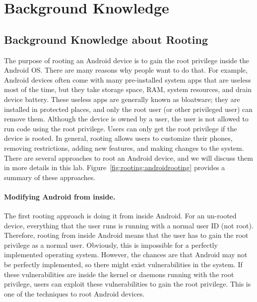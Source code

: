 \section{Background Knowledge}


\subsection{Background Knowledge about Rooting}

The purpose of rooting an Android device is to gain the root privilege
inside the Android OS. There are many reasons why people want to do that.
For example, Android devices often come with many pre-installed system apps that are
useless most of the time, but they take storage space, RAM,
system resources, and drain device battery. These useless
apps are generally known as bloatware; they are installed
in protected places, and only the root user (or other privileged user) 
can remove them. Although the device is owned by a user,
the user is not allowed to run code using the root privilege. 
Users can only get the root privilege if the device is rooted. 
In general, rooting allows users to customize their phones, removing restrictions,
adding new features, and making changes to the system. There are several
approaches to root an Android device, and we will discuss them in more
details in this lab. Figure~\ref{fig:rooting:androidrooting} provides a summary of these
approaches.


\paragraph{Modifying Android from inside.}
The first rooting approach is doing it from inside Android. For an un-rooted device, everything that
the user runs is running with a normal user ID (not root). Therefore,
rooting from inside Android means that the user has to gain the root
privilege as a normal user. Obviously, this is impossible for 
a perfectly implemented operating system. However, the chances are that
Android may not be perfectly implemented, so there might exist
vulnerabilities in the system. If these vulnerabilities are inside the kernel or daemons 
running with the root privilege, users can exploit these vulnerabilities to
gain the root privilege. This is one of the techniques to root Android
devices. 

